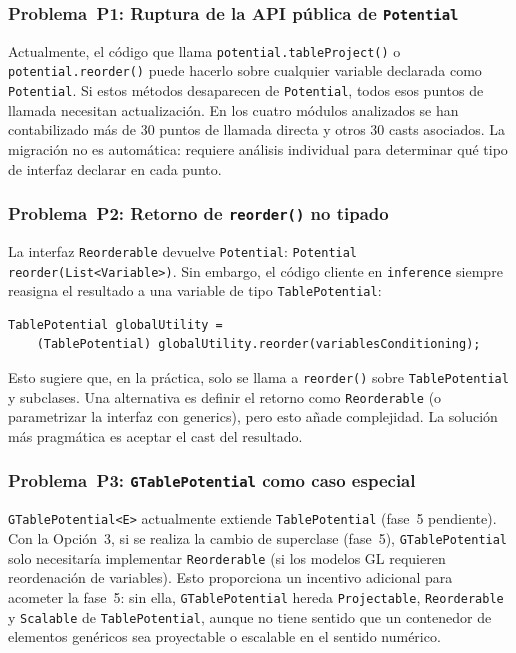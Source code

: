 \documentclass[11pt,a4paper]{article}
\newcommand{\code}[1]{\texttt{#1}}
\begin{document}
\subsubsection{Problema~P1: Ruptura de la API pública de \code{Potential}}

Actualmente, el código que llama \code{potential.tableProject()} o
\code{potential.reorder()} puede hacerlo sobre cualquier variable declarada como
\code{Potential}.  Si estos métodos desaparecen de \code{Potential}, todos esos
puntos de llamada necesitan actualización.  En los cuatro módulos analizados
se han contabilizado más de 30 puntos de llamada directa y otros 30 casts
asociados.  La migración no es automática: requiere análisis individual
para determinar qué tipo de interfaz declarar en cada punto.

\subsubsection{Problema~P2: Retorno de \code{reorder()} no tipado}

La interfaz \code{Reorderable} devuelve \code{Potential}:
\code{Potential reorder(List<Variable>)}.  Sin embargo, el código cliente
en \code{inference} siempre reasigna el resultado a una variable de tipo
\code{TablePotential}:

\begin{lstlisting}[caption={El resultado de \code{reorder()} siempre se usa como \code{TablePotential}}]
TablePotential globalUtility =
    (TablePotential) globalUtility.reorder(variablesConditioning);
\end{lstlisting}

Esto sugiere que, en la práctica, solo se llama a \code{reorder()} sobre
\code{TablePotential} y subclases.  Una alternativa es definir el retorno como
\code{Reorderable} (o parametrizar la interfaz con generics), pero esto añade
complejidad.  La solución más pragmática es aceptar el cast del resultado.

\subsubsection{Problema~P3: \code{GTablePotential} como caso especial}

\code{GTablePotential<E>} actualmente extiende \code{TablePotential} (fase~5
pendiente).  Con la Opción~3, si se realiza la cambio de superclase (fase~5),
\code{GTablePotential} solo necesitaría implementar \code{Reorderable} (si los
modelos GL requieren reordenación de variables).  Esto proporciona un incentivo
adicional para acometer la fase~5: sin ella, \code{GTablePotential} hereda
\code{Projectable}, \code{Reorderable} y \code{Scalable} de \code{TablePotential},
aunque no tiene sentido que un contenedor de elementos genéricos sea proyectable
o escalable en el sentido numérico.
\end{document}
